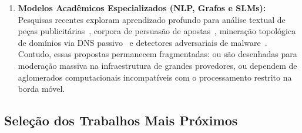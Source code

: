 \begin{enumerate}
    \item \textbf{Modelos Acad\^{e}micos Especializados (NLP, Grafos e SLMs):} Pesquisas recentes exploram aprendizado profundo para an\'{a}lise textual de pe\c{c}as publicit\'{a}rias~\cite{muzakir2025text}, corpora de persuas\~{a}o de apostas~\cite{alvarezojeda2025precom}, minera\c{c}\~{a}o topol\'{o}gica de dom\'{i}nios via DNS passivo~\cite{nabeel2020following,khalil2016discovering} e detectores adversariais de malware~\cite{li2025automated,zhang2025fighting}. Contudo, essas propostas permanecem fragmentadas: ou s\~{a}o desenhadas para modera\c{c}\~{a}o massiva na infraestrutura de grandes provedores, ou dependem de aglomerados computacionais incompat\'{i}veis com o processamento restrito na borda m\'{o}vel.
\end{enumerate}

\subsection{Sele\c{c}\~{a}o dos Trabalhos Mais Pr\'{o}ximos}

